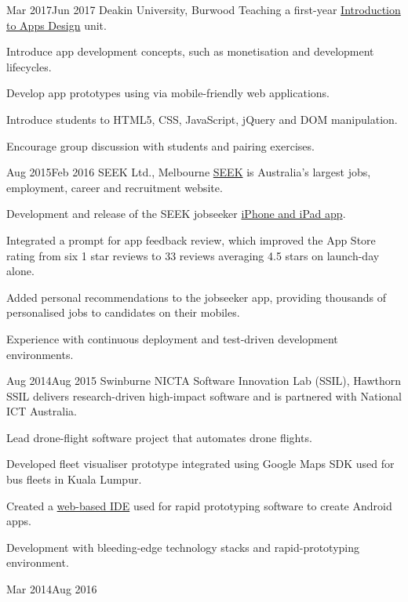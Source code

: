 {    
        {Mar 2017}{Jun 2017}
        {Deakin University, Burwood}
        {Teaching a first-year \href{http://www.deakin.edu.au/current-students-courses/unit.php?unit=SIT120}{Introduction to Apps Design} unit.}
        {
          \item Introduce app development concepts, such as monetisation and development lifecycles.
          \item Develop app prototypes using via mobile-friendly web applications.
          \item Introduce students to HTML5, CSS, JavaScript, jQuery and DOM manipulation.
          \item Encourage group discussion with students and pairing exercises.
        }
    \clearpage
        {Aug 2015}{Feb 2016}
        {SEEK Ltd., Melbourne}
        {\href{http://seek.com.au}{SEEK} is Australia's largest jobs, employment, career and recruitment website.}
        {
          \item Development and release of the SEEK jobseeker \href{https://itunes.apple.com/us/app/seek-jobs/id520400855?mt=8}{iPhone and iPad app}.
          \item Integrated a prompt for app feedback review, which improved the App Store rating from six 1 star reviews to 33 reviews averaging 4.5 stars on launch-day alone.
          \item Added personal recommendations to the jobseeker app, providing thousands of personalised jobs to candidates on their mobiles.
          \item Experience with continuous deployment and test-driven development environments.
        }
        {Aug 2014}{Aug 2015}
        {Swinburne NICTA Software Innovation Lab (SSIL), Hawthorn}
        {SSIL delivers research-driven high-impact software and is partnered with National ICT Australia.}
        {
          \item Lead drone-flight software project that automates drone flights.
          \item Developed fleet visualiser prototype integrated using Google Maps SDK used for bus fleets in Kuala Lumpur.
          \item Created a \href{http://rappt.io/}{web-based IDE} used for rapid prototyping software to create Android apps.
          \item Development with bleeding-edge technology stacks and rapid-prototyping environment.
        }
        {Mar 2014}{Aug 2016}
}
